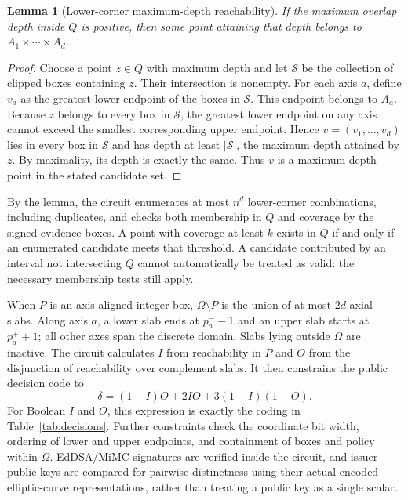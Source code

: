 \documentclass[pdflatex,iicol,sn-mathphys-num]{sn-jnl}
\theoremstyle{thmstyleone}
\newtheorem{lemma}{Lemma}
\begin{document}
\begin{lemma}[Lower-corner maximum-depth reachability]\label{lem:corner}
If the maximum overlap depth inside $Q$ is positive, then some point attaining that depth belongs to $A_1\times\cdots\times A_d$.
\end{lemma}
\begin{proof}
Choose a point $z\in Q$ with maximum depth and let $\mathcal S$ be the collection of clipped boxes containing $z$. Their intersection is nonempty. For each axis $a$, define $v_a$ as the greatest lower endpoint of the boxes in $\mathcal S$. This endpoint belongs to $A_a$. Because $z$ belongs to every box in $\mathcal S$, the greatest lower endpoint on any axis cannot exceed the smallest corresponding upper endpoint. Hence $v=(v_1,\ldots,v_d)$ lies in every box in $\mathcal S$ and has depth at least $|\mathcal S|$, the maximum depth attained by $z$. By maximality, its depth is exactly the same. Thus $v$ is a maximum-depth point in the stated candidate set.
\end{proof}

By the lemma, the circuit enumerates at most $n^d$ lower-corner combinations, including duplicates, and checks both membership in $Q$ and coverage by the signed evidence boxes. A point with coverage at least $k$ exists in $Q$ if and only if an enumerated candidate meets that threshold. A candidate contributed by an interval not intersecting $Q$ cannot automatically be treated as valid: the necessary membership tests still apply.

When $P$ is an axis-aligned integer box, $\Omega\setminus P$ is the union of at most $2d$ axial slabs. Along axis $a$, a lower slab ends at $p_a^- -1$ and an upper slab starts at $p_a^+ +1$; all other axes span the discrete domain. Slabs lying outside $\Omega$ are inactive. The circuit calculates $I$ from reachability in $P$ and $O$ from the disjunction of reachability over complement slabs. It then constrains the public decision code to
\begin{equation}\label{eq:decisioncode}
\delta=(1-I)O+2IO+3(1-I)(1-O).
\end{equation}
For Boolean $I$ and $O$, this expression is exactly the coding in Table~\ref{tab:decisions}. Further constraints check the coordinate bit width, ordering of lower and upper endpoints, and containment of boxes and policy within $\Omega$. EdDSA/MiMC signatures are verified inside the circuit, and issuer public keys are compared for pairwise distinctness using their actual encoded elliptic-curve representations, rather than treating a public key as a single scalar.
\end{document}
